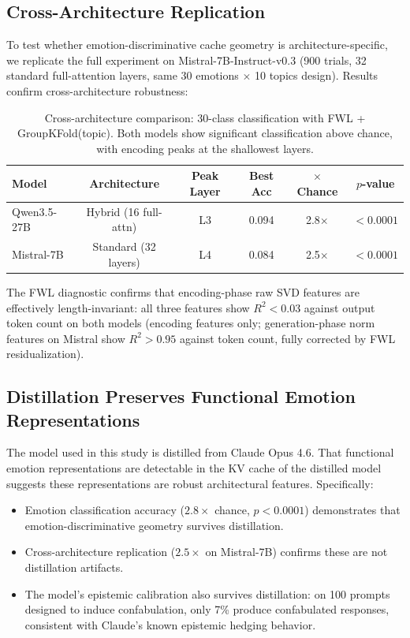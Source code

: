 \documentclass[11pt,a4paper]{article}
\begin{document}
\subsection{Cross-Architecture Replication}

To test whether emotion-discriminative cache geometry is architecture-specific, we replicate the full experiment on Mistral-7B-Instruct-v0.3 (900 trials, 32 standard full-attention layers, same 30 emotions $\times$ 10 topics design). Results confirm cross-architecture robustness:

\begin{table}[H]
\centering
\caption{Cross-architecture comparison: 30-class classification with FWL + GroupKFold(topic). Both models show significant classification above chance, with encoding peaks at the shallowest layers.}
\label{tab:cross_arch}
\begin{tabular}{lccccc}
\toprule
\textbf{Model} & \textbf{Architecture} & \textbf{Peak Layer} & \textbf{Best Acc} & \textbf{$\times$ Chance} & \textbf{$p$-value} \\
\midrule
Qwen3.5-27B & Hybrid (16 full-attn) & L3 & 0.094 & 2.8$\times$ & $< 0.0001$ \\
Mistral-7B & Standard (32 layers) & L4 & 0.084 & 2.5$\times$ & $< 0.0001$ \\
\bottomrule
\end{tabular}
\end{table}

The FWL diagnostic confirms that encoding-phase raw SVD features are effectively length-invariant: all three features show $R^2 < 0.03$ against output token count on both models (encoding features only; generation-phase norm features on Mistral show $R^2 > 0.95$ against token count, fully corrected by FWL residualization).

\subsection{Distillation Preserves Functional Emotion Representations}

The model used in this study is distilled from Claude Opus 4.6. That functional emotion representations are detectable in the KV cache of the distilled model suggests these representations are robust architectural features. Specifically:

\begin{itemize}[nosep]
    \item Emotion classification accuracy ($2.8\times$ chance, $p < 0.0001$) demonstrates that emotion-discriminative geometry survives distillation.
    \item Cross-architecture replication ($2.5\times$ on Mistral-7B) confirms these are not distillation artifacts.
    \item The model's epistemic calibration also survives distillation: on 100 prompts designed to induce confabulation, only 7\% produce confabulated responses, consistent with Claude's known epistemic hedging behavior.
\end{itemize}
\end{document}

